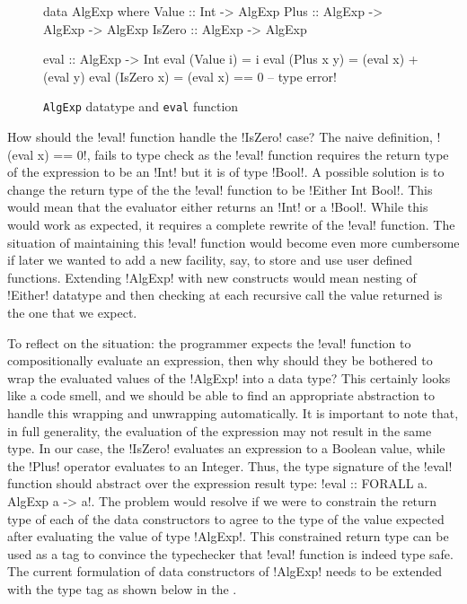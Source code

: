 \documentclass[screen,nonacm,manuscript,review]{acmart} %
\begin{document}
\begin{figure}[ht]
\centering
\begin{minipage}{0.5\linewidth}
\begin{CenteredBox}
\begin{code}
data AlgExp where
  Value  :: Int              -> AlgExp
  Plus   :: AlgExp -> AlgExp -> AlgExp
  IsZero :: AlgExp           -> AlgExp
\end{code}
\end{CenteredBox}
\end{minipage}%
\begin{minipage}{0.5\linewidth}
\begin{CenteredBox}
\begin{code}
eval :: AlgExp -> Int
eval (Value i) = i
eval (Plus x y) = (eval x) + (eval y)
eval (IsZero x) = (eval x) == 0 -- type error!
\end{code}
\end{CenteredBox}
\end{minipage}
\caption{\texttt{AlgExp} datatype and \texttt{eval} function}
\label{fig:algexp-eval}
\end{figure}

How should the !eval! function handle the !IsZero! case? The naive
definition, !(eval x) == 0!, fails to type check as the !eval!
function requires the return type of the expression to be an !Int! but
it is of type !Bool!. A possible solution is to change the return type
of the the !eval! function to be !Either Int Bool!. This would mean
that the evaluator either returns an !Int! or a !Bool!. While this would work as
expected, it requires a complete rewrite of the !eval! function. The
situation of maintaining this !eval! function would become even more
cumbersome if later we wanted to add a new facility, say, to store and use user
defined functions. Extending !AlgExp! with new constructs would mean
nesting of !Either! datatype and then checking at each recursive
call the value returned is the one that we expect.

To reflect on the situation: the programmer
expects the !eval! function to compositionally evaluate an
expression, then why should they be bothered to wrap the
evaluated values of the !AlgExp! into a data type? This certainly
looks like a code smell, and we should be able to find an appropriate
abstraction to handle this wrapping and unwrapping automatically.
It is important to note that, in full generality, the evaluation of the expression
may not result in the same type. In our case, the !IsZero! evaluates
an expression to a Boolean value, while the !Plus! operator evaluates
to an Integer. Thus, the type signature of the !eval! function should
abstract over the expression result type:
!eval :: FORALL a. AlgExp a -> a!. The problem
would resolve if we were to constrain the return type of each of the
data constructors to agree to the type of the value expected after
evaluating the value of type !AlgExp!. This constrained return type
can be used as a tag to convince the typechecker that !eval! function
is indeed type safe. The current formulation of data
constructors of !AlgExp! needs to be extended with the type tag
as shown below in the .
\end{document}
